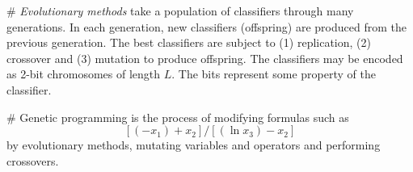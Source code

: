 \documentclass[12pt, a4paper]{article}
\begin{document}
\begin{easylist}[itemize]
# \emph{Evolutionary methods} take a population of classifiers through many generations.
In each generation, new classifiers (offspring) are produced from the previous generation.
The best classifiers are subject to 
(1) replication, 
(2) crossover and 
(3) mutation to produce offspring.
The classifiers may be encoded as 2-bit chromosomes of length $L$.
The bits represent some property of the classifier.


# Genetic programming is the process of modifying formulas such as
\begin{equation*}
	\left[ (- x_1) + x_2 \right] / \left[ ( \ln x_3) - x_2 \right]
\end{equation*}
by evolutionary methods, mutating variables and operators and performing crossovers.
\end{easylist}
\end{document}
